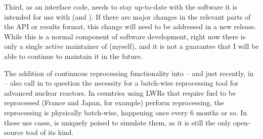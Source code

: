 Third, as an interface code, \SaltProc needs to stay up-to-date with the
software it is intended for use with (\OpenMC and \SerpentTWO). If there are
major changes in the relevant parts of the API or results format, this change
will need to be addressed in a new \SaltProc release. While this is a normal
component of software development, right now there is only a single active
maintainer of \SaltProc (myself), and it is not a guarantee that I will
be able to continue to maintain it in the future.

The addition of continuous reprocessing functionality into \SerpentTWO -- and 
just recently, in  \OpenMC -- also call in to question the necessity for a
batch-wise reprocessing tool for advanced nuclear reactors. In countries using
LWRs that require fuel to be reprocessed (France and Japan, for example) perform
reprocessing, the reprocessing is physically batch-wise, happening once every 6
months or so. In these use cases, \SaltProc is uniquely poised to simulate them,
as it is still the only open-source tool of its kind.
